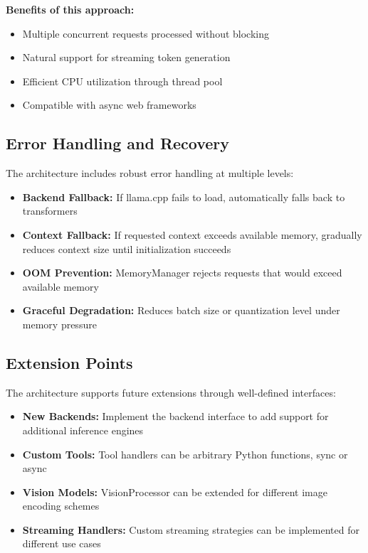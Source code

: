 \textbf{Benefits of this approach:}
\begin{itemize}
    \item Multiple concurrent requests processed without blocking
    \item Natural support for streaming token generation
    \item Efficient CPU utilization through thread pool
    \item Compatible with async web frameworks
\end{itemize}

\subsection{Error Handling and Recovery}

The architecture includes robust error handling at multiple levels:

\begin{itemize}
    \item \textbf{Backend Fallback:} If llama.cpp fails to load, automatically falls back to transformers
    \item \textbf{Context Fallback:} If requested context exceeds available memory, gradually reduces context size until initialization succeeds
    \item \textbf{OOM Prevention:} MemoryManager rejects requests that would exceed available memory
    \item \textbf{Graceful Degradation:} Reduces batch size or quantization level under memory pressure
\end{itemize}

\subsection{Extension Points}

The architecture supports future extensions through well-defined interfaces:

\begin{itemize}
    \item \textbf{New Backends:} Implement the backend interface to add support for additional inference engines
    \item \textbf{Custom Tools:} Tool handlers can be arbitrary Python functions, sync or async
    \item \textbf{Vision Models:} VisionProcessor can be extended for different image encoding schemes
    \item \textbf{Streaming Handlers:} Custom streaming strategies can be implemented for different use cases
\end{itemize}

